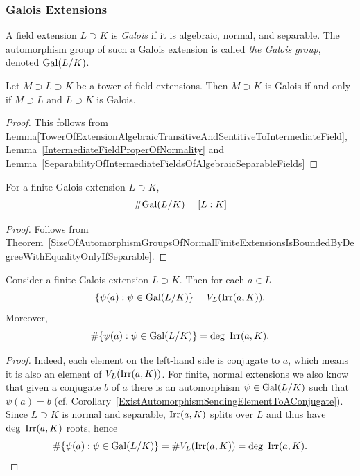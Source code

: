 \subsubsection{Galois Extensions}
    \begin{definition}
        A field extension $L\supset K$ is \emph{Galois} if it is algebraic, normal, and separable. The automorphism group of such a Galois extension is called \emph{the Galois group}, denoted $\mathrm{Gal}(L/K)$.  
    \end{definition}
    \begin{lemma}\label{TowerPropertyOfGaloisExtensions}
        Let $M\supset L\supset K$ be a tower of field extensions. Then $M\supset K$ is Galois if and only if $M\supset L$ and $L\supset K$ is Galois.
    \end{lemma}
    \begin{proof}
        This follows from Lemma\ref{TowerOfExtensionAlgebraicTransitiveAndSentitiveToIntermediateField}, Lemma~\ref{IntermediateFieldProperOfNormality} and Lemma~\ref{SeparabilityOfIntermediateFieldsOfAlgebraicSeparableFields} 
    \end{proof}
    \begin{corollary}
        For a finite Galois extension $L\supset K$,
        $$
            \#\mathrm{Gal}(L/K) = [L : K]
        $$ 
    \end{corollary}
    \begin{proof}
        Follows from Theorem~\ref{SizeOfAutomorphismGroupsOfNormalFiniteExtensionsIsBoundedByDegreeWithEqualityOnlyIfSeparable}.
    \end{proof}
    \begin{lemma}
        Consider a finite Galois extension $L\supset K$. Then for each $a\in L$
        $$
            \{\psi(a) : \psi\in \mathrm{Gal}(L/K)\} = V_L(\mathrm{Irr}(a,K)). 
        $$
        Moreover, 
        $$
           \#\{\psi(a) : \psi\in \Gal(L/K)\} = \deg \ \Irr(a,K).
        $$
    \end{lemma}
    \begin{proof}
        Indeed, each element on the left-hand side is conjugate to $a$, which means it is also an element of $V_L(\mathrm{Irr}(a,K))$. For finite, normal extensions we also know that given a conjugate $b$ of $a$ there is an automorphism $\psi\in \mathrm{Gal}(L/K)$ such that $\psi(a)=b$ (cf. Corollary~\ref{ExistAutomorphismSendingElementToAConjugate}). Since $L\supset K$ is normal and separable, $\mathrm{Irr}(a,K)$ splits over $L$ and thus have $\deg \ \mathrm{Irr}(a,K)$ roots, hence
        $$
            \#\{\psi(a) : \psi\in \mathrm{Gal}(L/K)\} = \#V_L(\mathrm{Irr}(a,K)) =  \deg \ \mathrm{Irr}(a,K).
        $$  
    \end{proof}
